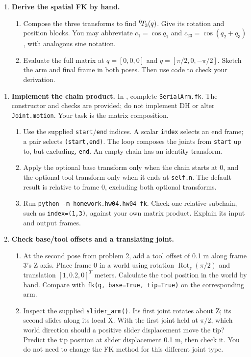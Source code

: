 \begin{enumerate}
\item \textbf{Derive the spatial FK by hand.}
\begin{enumerate}
\item Compose the three transforms to find ${}^{0}\!T_{3}(q)$.
Give its rotation and position blocks. You may abbreviate
$c_1=\cos q_1$ and $c_{23}=\cos(q_2+q_3)$, with analogous sine notation.
\item Evaluate the full matrix at $q=[0,0,0]$ and
$q=[\pi/2,0,-\pi/2]$. Sketch the arm and final frame in both poses.
Then use code to check your derivation.
\end{enumerate}
\end{enumerate}

\newpage
\begin{enumerate}[start=3]
\item \textbf{Implement the chain product.}
In , complete \texttt{SerialArm.fk}.
The constructor and checks are provided; do not implement DH or alter
\texttt{Joint.motion}. Your task is the matrix composition.
\begin{enumerate}
\item Use the supplied \texttt{start}/\texttt{end} indices. A scalar
\texttt{index} selects an end frame; a pair selects \texttt{(start,end)}.
The loop composes the joints from \texttt{start} up to, but excluding,
\texttt{end}. An empty chain has an identity transform.
\item Apply the optional base transform only when the chain starts at 0,
and the optional tool transform only when it ends at \texttt{self.n}.
The default result is relative to frame 0, excluding both optional transforms.
\item Run \texttt{python -m homework.hw04.hw04\_fk}. Check one relative
subchain, such as \texttt{index=(1,3)}, against your own matrix product.
Explain its input and output frames.
\end{enumerate}

\item \textbf{Check base/tool offsets and a translating joint.}
\begin{enumerate}
\item At the second pose from problem 2, add a tool offset of 0.1 m along
frame 3's Z axis. Place frame 0 in a world using rotation
$\operatorname{Rot}_z(\pi/2)$ and translation $[1,0.2,0]^T$ meters.
Calculate the tool position in the world by hand. Compare with
\texttt{fk(q, base=True, tip=True)} on the corresponding arm.
\item Inspect the supplied \texttt{slider\_arm()}. Its first joint rotates
about Z; its second slides along its local X. With the first joint held at
$\pi/2$, which world direction should a positive slider displacement move
the tip? Predict the tip position at slider displacement 0.1 m, then check it.
You do not need to change the FK method for this different joint type.
\end{enumerate}

\end{enumerate}

